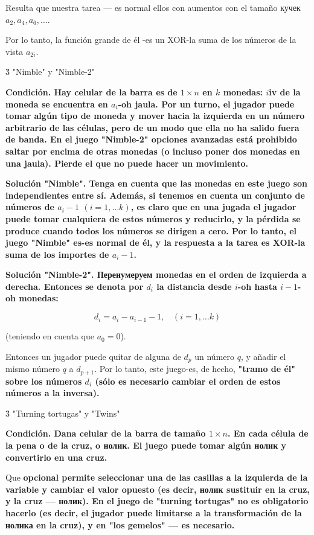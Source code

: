 Resulta que nuestra tarea --- es normal ellos con aumentos con el tamaño кучек $a_2, a_4, a_6, \ldots$.

Por lo tanto, la función grande de él -es un XOR-la suma de los números de la vista $a_{2i}$.


\h3{ "Nimble" y "Nimble-2" }

\bf{Condición}. Hay celular de la barra es de $1 \times n$ en $k$ monedas: $i$iv de la moneda se encuentra en $a_i$-oh jaula. Por un turno, el jugador puede tomar algún tipo de moneda y mover hacia la izquierda en un número arbitrario de las células, pero de un modo que ella no ha salido fuera de banda. En el juego "Nimble-2" opciones avanzadas está prohibido saltar por encima de otras monedas (o incluso poner dos monedas en una jaula). Pierde el que no puede hacer un movimiento.

\bf{Solución "Nimble"}. Tenga en cuenta que las monedas en este juego son independientes entre sí. Además, si tenemos en cuenta un conjunto de números de $a_i-1$ $(i = 1, \ldots k)$, es claro que en una jugada el jugador puede tomar cualquiera de estos números y reducirlo, y la pérdida se produce cuando todos los números se dirigen a cero. Por lo tanto, el juego "Nimble" es-es \bf{normal de él}, y la respuesta a la tarea es XOR-la suma de los importes de $a_i-1$.

\bf{Solución "Nimble-2"}. Перенумеруем monedas en el orden de izquierda a derecha. Entonces se denota por $d_i$ la distancia desde $i$-oh hasta $i-1$-oh monedas:

$$ d_i = a_i - a_{i-1} - 1, ~~~~ (i = 1, \ldots k) $$

(teniendo en cuenta que $a_0 = 0$).

Entonces un jugador puede quitar de alguna de $d_p$ un número $q$, y añadir el mismo número $q$ a $d_{p+1}$. Por lo tanto, este juego-es, de hecho, \bf{"tramo de él"} sobre los números $d_i$ (sólo es necesario cambiar el orden de estos números a la inversa).


\h3{ "Turning tortugas" y "Twins" }

\bf{Condición}. Dana celular de la barra de tamaño $1 \times n$. En cada célula de la pena o de la cruz, o нолик. El juego puede tomar algún нолик y convertirlo en una cruz.

Que \bf{opcional} permite seleccionar una de las casillas a la izquierda de la variable y cambiar el valor opuesto (es decir, нолик sustituir en la cruz, y la cruz --- нолик). En el juego de "turning tortugas" no es obligatorio hacerlo (es decir, el jugador puede limitarse a la transformación de la нолика en la cruz), y en "los gemelos" --- es necesario.


